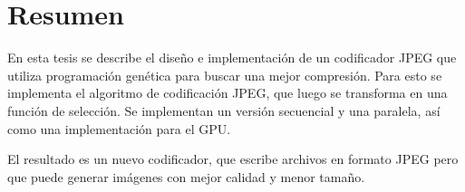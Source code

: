 \begingroup
\let\clearpage\relax
\let\cleardoublepage\relax
\let\cleardoublepage\relax

\chapter*{Resumen}

En esta tesis se describe el diseño e implementación de un codificador JPEG que
utiliza programación genética para buscar una mejor compresión. Para esto se
implementa el algoritmo de codificación JPEG, que luego se transforma en una
función de selección. Se implementan un versión secuencial y una paralela, así
como una implementación para el GPU.

El resultado es un nuevo codificador, que escribe archivos en formato JPEG pero
que puede generar imágenes con mejor calidad y menor tamaño.



\vfill

\endgroup

